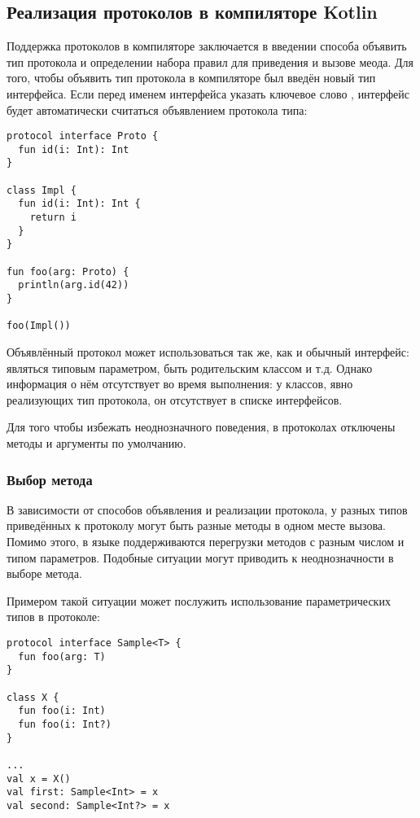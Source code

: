 \subsection{Реализация протоколов в компиляторе Kotlin}

Поддержка протоколов в компиляторе заключается в введении способа объявить тип протокола и определении набора правил для приведения и вызове меода. Для того, чтобы объявить тип протокола в компиляторе был введён новый тип интерфейса. Если перед именем интерфейса указать ключевое слово , интерфейс будет автоматически считаться объявлением протокола типа:

\begin{verbatim}
protocol interface Proto {
  fun id(i: Int): Int
}

class Impl {
  fun id(i: Int): Int {
    return i
  }
}

fun foo(arg: Proto) {
  println(arg.id(42))
}

foo(Impl())
\end{verbatim}

Объявлённый протокол может использоваться так же, как и обычный интерфейс: являться типовым параметром, быть родительским классом и т.д. Однако информация о нём отсутствует во время выполнения: у классов, явно реализующих тип протокола, он отсутствует в списке интерфейсов.

Для того чтобы избежать неоднозначного поведения, в протоколах отключены методы и аргументы по умолчанию.

\subsubsection{Выбор метода}

В зависимости от способов объявления и реализации протокола, у разных типов приведённых к протоколу могут быть разные методы в одном месте вызова. Помимо этого, в языке  поддерживаются перегрузки методов с разным числом и типом параметров. Подобные ситуации могут приводить к неоднозначности в выборе метода.

Примером такой ситуации может послужить использование параметрических типов в протоколе:
\begin{verbatim}
protocol interface Sample<T> {
  fun foo(arg: T)
}

class X {
  fun foo(i: Int)
  fun foo(i: Int?)
}

...
val x = X()
val first: Sample<Int> = x
val second: Sample<Int?> = x

\end{verbatim}

